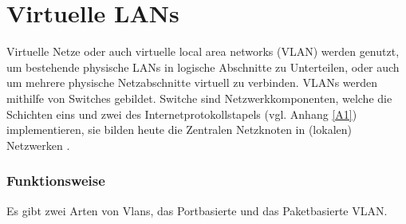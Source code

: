 \chapter{Virtuelle LANs}

Virtuelle Netze oder auch virtuelle local area networks (VLAN) werden genutzt, um bestehende physische LANs in logische Abschnitte zu Unterteilen, oder auch um mehrere physische Netzabschnitte virtuell zu verbinden. VLANs werden mithilfe von Switches gebildet. Switche sind Netzwerkkomponenten, welche die Schichten eins und zwei des Internetprotokollstapels (vgl. Anhang \ref{A1}) implementieren, sie bilden heute die Zentralen Netzknoten in (lokalen) Netzwerken \cite{zisler2018computer}. 


\subsection{Funktionsweise}


Es gibt zwei Arten von Vlans, das Portbasierte und das Paketbasierte VLAN. 

